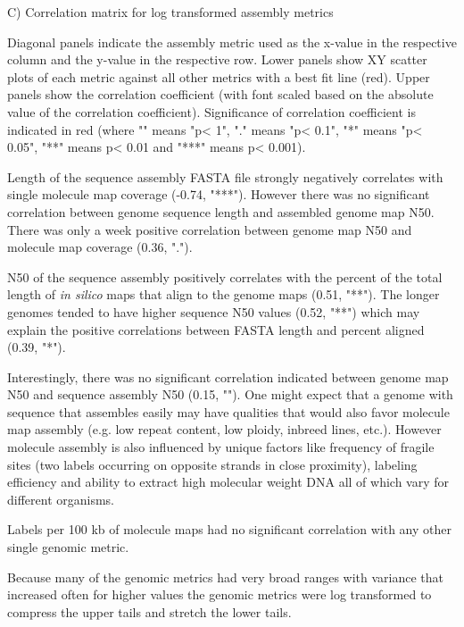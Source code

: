 C) Correlation matrix for log transformed assembly metrics

Diagonal panels indicate the assembly metric used as the x-value in the respective column and the y-value in the respective row. Lower panels show XY scatter plots of each metric against all other metrics with a best fit line (red). Upper panels show the correlation coefficient (with font scaled based on the absolute value of the correlation coefficient). Significance of correlation coefficient is indicated in red (where "" means "p< 1", "." means "p< 0.1", "*" means "p< 0.05", "**" means p< 0.01 and "***" means p< 0.001).

Length of the sequence assembly FASTA file strongly negatively correlates with single molecule map coverage (-0.74, "***"). However there was no significant correlation between genome sequence length and assembled genome map N50. There was only a week positive correlation between genome map N50 and molecule map coverage (0.36, "."). 

N50 of the sequence assembly positively correlates with the percent of the total length of \textit{in silico} maps that align to the genome maps (0.51, "**"). The longer genomes tended to have higher sequence N50 values (0.52, "**") which may explain the positive correlations between FASTA length and percent aligned (0.39, "*").

Interestingly, there was no significant correlation indicated between genome map N50 and sequence assembly N50 (0.15, ""). One might expect that a genome with sequence that assembles easily may have qualities that would also favor molecule map assembly (e.g. low repeat content, low ploidy, inbreed lines, etc.). However molecule assembly is also influenced by unique factors like frequency of fragile sites (two labels occurring on opposite strands in close proximity), labeling efficiency and ability to extract high molecular weight DNA all of which vary for different organisms.

Labels per 100 kb of molecule maps had no significant correlation with any other single genomic metric.

Because many of the genomic metrics had very broad ranges with variance that increased often for higher values the genomic metrics were log transformed to compress the upper tails and stretch the lower tails.

